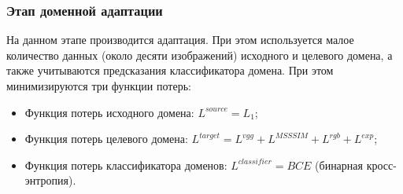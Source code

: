 \subsubsection{Этап доменной адаптации}

На данном этапе производится адаптация. При этом используется малое количество данных (около десяти изображений) исходного и целевого домена, а также учитываются предсказания классификатора домена. При этом минимизируются три функции потерь:
\begin{itemize}
    \item Функция потерь исходного домена: $L^{source}=L_1$;
    \item Функция потерь целевого домена: $L^{target}=L^{vgg} + L^{MSSSIM} + L^{rgb} + L^{exp}$;
    \item Функция потерь классификатора доменов: $L^{classifier}=BCE$ (бинарная кросс-энтропия).
\end{itemize}
